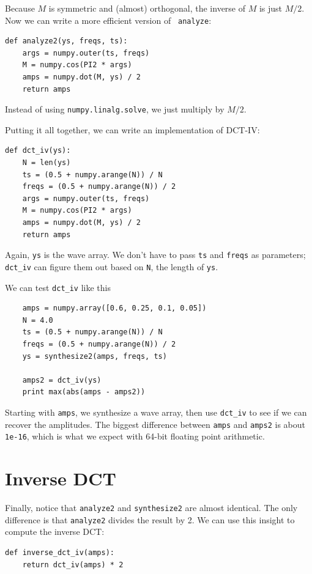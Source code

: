 \documentclass[12pt]{book}
\begin{document}
Because $M$ is symmetric and (almost) orthogonal, the inverse of $M$
is just $M/2$.  Now we can write a more efficient version of {\tt
  analyze}:

\begin{verbatim}
def analyze2(ys, freqs, ts):
    args = numpy.outer(ts, freqs)
    M = numpy.cos(PI2 * args)
    amps = numpy.dot(M, ys) / 2
    return amps
\end{verbatim}

Instead of using {\tt numpy.linalg.solve}, we just multiply
by $M/2$.

Putting it all together, we can write an implementation of
DCT-IV:

\begin{verbatim}
def dct_iv(ys):
    N = len(ys)
    ts = (0.5 + numpy.arange(N)) / N
    freqs = (0.5 + numpy.arange(N)) / 2
    args = numpy.outer(ts, freqs)
    M = numpy.cos(PI2 * args)
    amps = numpy.dot(M, ys) / 2
    return amps
\end{verbatim}

Again, {\tt ys} is the wave array.  We don't have to pass
{\tt ts} and {\tt freqs} as parameters; \verb"dct_iv" can
figure them out based on {\tt N}, the length of {\tt ys}.

We can test \verb"dct_iv" like this

\begin{verbatim}
    amps = numpy.array([0.6, 0.25, 0.1, 0.05])
    N = 4.0
    ts = (0.5 + numpy.arange(N)) / N
    freqs = (0.5 + numpy.arange(N)) / 2
    ys = synthesize2(amps, freqs, ts)

    amps2 = dct_iv(ys)
    print max(abs(amps - amps2))
\end{verbatim}

Starting with {\tt amps}, we synthesize a wave array, then use
\verb"dct_iv" to see if we can recover the amplitudes.  The biggest
difference between {\tt amps} and {\tt amps2} is about {\tt 1e-16},
which is what we expect with 64-bit floating point arithmetic.


\section{Inverse DCT}

Finally, notice that {\tt analyze2} and {\tt synthesize2} are almost
identical.  The only difference is that {\tt analyze2} divides the
result by 2.  We can use this insight to compute the inverse DCT:

\begin{verbatim}
def inverse_dct_iv(amps):
    return dct_iv(amps) * 2
\end{verbatim}
\end{document}
